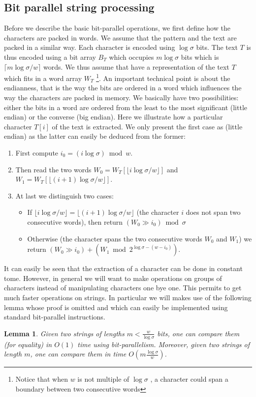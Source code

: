 \documentclass{article}
\newcommand{\?}{\mskip1.5mu}
\newtheorem{lemma}{Lemma}
\begin{document}
\subsection{Bit parallel string processing}
Before we describe the basic bit-parallel operations, we first define how the characters are packed in words. We assume that the pattern and the text are packed in a similar way. Each character is encoded using $\log\sigma$ bits. The text $T$ is thus encoded using a bit array $B_T$ which occupies $m\log\sigma$ bits which is $\lceil m\log\sigma/w\rceil$ words. We thus assume that have a representation of the text $T$ which fits in a word array $W_T$ \footnote{Notice that when $w$ is not multiple of $\log\sigma$ , a character could span a boundary between two consecutive words}. An important technical point is about the endianness, that is the way the bits are ordered in a word which influences the way the characters are packed in memory. We basically have two possibilities: either the bits in a word are ordered from the least to the most significant (little endian) or the converse (big endian). Here we illustrate how a particular character $T[i]$ of the text is extracted. We only present the first case as (little endian) as the latter can easily be deduced from the former: 
\begin{enumerate}
\item First compute $i_0=(i\log\sigma)\bmod w$.
\item Then read the two words $W_0=W_T[\lfloor i\log\sigma/w\rfloor]$ and $W_1=W_T[\lfloor (i+1)\log\sigma/w\rfloor]$.
\item At last we distinguish two cases: 
\begin{itemize}
\item If $\lfloor i\log\sigma/w\rfloor=\lfloor (i+1)\log\sigma/w\rfloor$ (the character $i$ does not span two consecutive words), then return $(W_0\gg i_0)\bmod \sigma$ 
\item Otherwise (the character spans the two consecutive words $W_0$ and $W_1$) we return $(W_0\gg i_0)+(W_1 \bmod 2^{\log\sigma-(w-i_0)})$.
\end{itemize}
\end{enumerate}
It can easily be seen that the extraction of a character can be done in constant tome. However, in general we will want to make operations on groups of characters instead of manipulating characters one bye one. This permits to get much faster operations on strings. In particular we will makes use of the following lemma whose proof is omitted and which can easily be implemented using standard bit-parallel instructions. 
\begin{lemma}
Given two strings of lengths $m<\frac{w}{\log\sigma}$ bits, one can compare them (for equality) in $O(1)$ time using bit-parallelism. Moreover, given two strings of length $m$, one can compare them in time $O(m\frac{\log\sigma}{w})$. 
\end{lemma}
\end{document}
